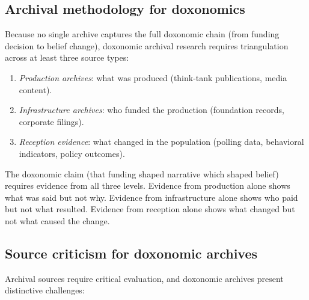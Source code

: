 \subsection{Archival methodology for doxonomics}

\begin{model}
\label{mod:triangulation}
Because no single archive captures the full doxonomic chain (from funding decision to belief change), doxonomic archival research requires triangulation across at least three source types:
\begin{enumerate}[nosep]
  \item \emph{Production archives}: what was produced (think-tank publications, media content).
  \item \emph{Infrastructure archives}: who funded the production (foundation records, corporate filings).
  \item \emph{Reception evidence}: what changed in the population (polling data, behavioral indicators, policy outcomes).
\end{enumerate}
The doxonomic claim (that funding shaped narrative which shaped belief) requires evidence from all three levels.
Evidence from production alone shows what was said but not why.
Evidence from infrastructure alone shows who paid but not what resulted.
Evidence from reception alone shows what changed but not what caused the change.
\end{model}

\subsection{Source criticism for doxonomic archives}

Archival sources require critical evaluation, and doxonomic archives present distinctive challenges:

